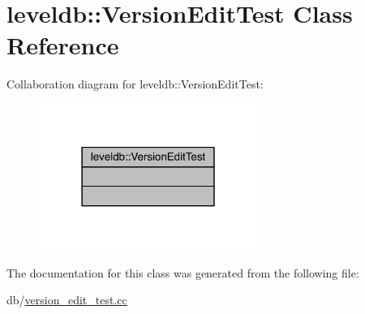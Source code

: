 \hypertarget{classleveldb_1_1_version_edit_test}{}\section{leveldb\+:\+:Version\+Edit\+Test Class Reference}
\label{classleveldb_1_1_version_edit_test}


Collaboration diagram for leveldb\+:\+:Version\+Edit\+Test\+:\nopagebreak
\begin{figure}[H]
\begin{center}
\leavevmode
\includegraphics[width=202pt]{classleveldb_1_1_version_edit_test__coll__graph}
\end{center}
\end{figure}


The documentation for this class was generated from the following file\+:\begin{DoxyCompactItemize}
\item 
db/\hyperlink{version__edit__test_8cc}{version\+\_\+edit\+\_\+test.\+cc}\end{DoxyCompactItemize}
